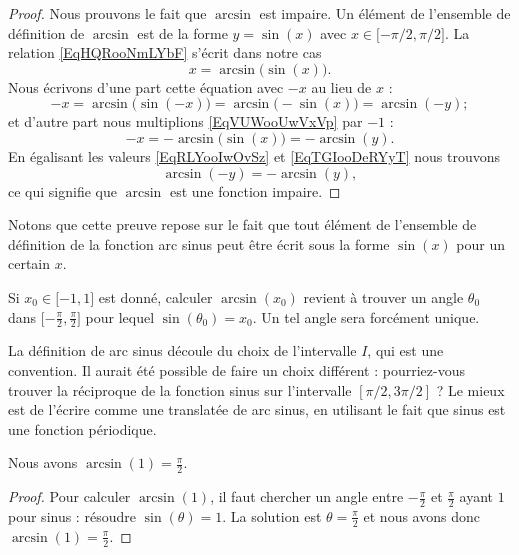 \begin{proof}
	Nous prouvons le fait que \( \arcsin\) est impaire. Un élément de l'ensemble de définition de \( \arcsin\) est de la forme \( y=\sin(x)\) avec \( x\in\mathopen[ -\pi/2 , \pi/2 \mathclose]\). La relation \eqref{EqHQRooNmLYbF} s'écrit dans notre cas
	\begin{equation}    \label{EqVUWooUwVxVp}
		x=\arcsin\big( \sin(x) \big).
	\end{equation}
	Nous écrivons d'une part cette équation avec \( -x\) au lieu de \( x\) :
	\begin{equation}    \label{EqRLYooIwOvSz}
		-x=\arcsin\big( \sin(-x) \big)=\arcsin\big( -\sin(x) \big)=\arcsin(-y);
	\end{equation}
	et d'autre part nous multiplions \eqref{EqVUWooUwVxVp} par \( -1\) :
	\begin{equation}    \label{EqTGIooDeRYyT}
		-x=-\arcsin\big( \sin(x) \big)=-\arcsin(y).
	\end{equation}
	En égalisant les valeurs \eqref{EqRLYooIwOvSz} et \eqref{EqTGIooDeRYyT} nous trouvons
	\begin{equation}
		\arcsin(-y)=-\arcsin(y),
	\end{equation}
	ce qui signifie que \( \arcsin\) est une fonction impaire.
\end{proof}
Notons que cette preuve repose sur le fait que tout élément de l'ensemble de définition de la fonction arc sinus peut être écrit sous la forme \( \sin(x)\) pour un certain \( x\).

Si \( x_0\in\mathopen[ -1 , 1 \mathclose]\) est donné, calculer \( \arcsin(x_0)\) revient à trouver un angle \( \theta_0\) dans \( \mathopen[ -\frac{ \pi }{2} , \frac{ \pi }{2} \mathclose]\) pour lequel \( \sin(\theta_0)=x_0\). Un tel angle sera forcément unique.

\begin{remark}
	La définition de arc sinus découle du choix de l'intervalle \( I\), qui est une convention. Il aurait été possible de faire un choix différent : pourriez-vous trouver la réciproque de la fonction sinus sur l'intervalle \( [\pi/2, 3\pi/2]\) ? Le mieux est de l'écrire comme une translatée de arc sinus, en utilisant le fait que sinus est une fonction périodique.
\end{remark}

\begin{lemma}
	Nous avons	\( \arcsin(1)=\frac{ \pi }{2}\).
\end{lemma}

\begin{proof}
	Pour calculer \( \arcsin(1)\), il faut chercher un angle entre \( -\frac{ \pi }{2}\) et \( \frac{ \pi }{ 2 }\) ayant \( 1\) pour sinus : résoudre \( \sin(\theta)=1\). La solution est \( \theta=\frac{ \pi }{2}\) et nous avons donc \( \arcsin(1)=\frac{ \pi }{2}\).
\end{proof}


